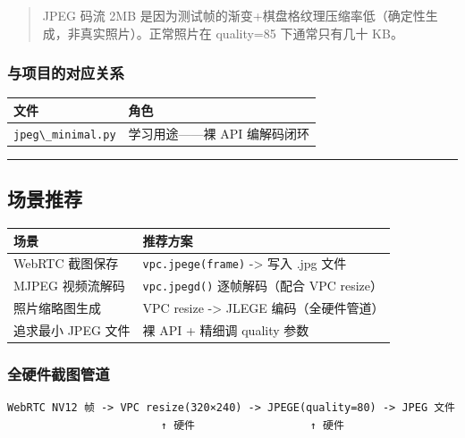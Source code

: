 \begin{quote}
JPEG 码流 2MB
是因为测试帧的渐变+棋盘格纹理压缩率低（确定性生成，非真实照片）。正常照片在
quality=85 下通常只有几十 KB。
\end{quote}

\subsubsection{与项目的对应关系}\label{src-book-chapter6-h136}

\begin{longtable}[]{@{}ll@{}}
\toprule\noalign{}
文件 & 角色 \\
\midrule\noalign{}
\endhead
\bottomrule\noalign{}
\endlastfoot
\passthrough{\lstinline!jpeg\_minimal.py!} & 学习用途------裸 API
编解码闭环 \\
\end{longtable}

\begin{center}\rule{0.5\linewidth}{0.5pt}\end{center}

\subsection{场景推荐}\label{src-book-chapter6-h137}

\begin{longtable}[]{@{}ll@{}}
\toprule\noalign{}
场景 & 推荐方案 \\
\midrule\noalign{}
\endhead
\bottomrule\noalign{}
\endlastfoot
WebRTC 截图保存 & \passthrough{\lstinline!vpc.jpege(frame)!}
-\textgreater{} 写入 .jpg 文件 \\
MJPEG 视频流解码 & \passthrough{\lstinline!vpc.jpegd()!} 逐帧解码（配合
VPC resize） \\
照片缩略图生成 & VPC resize -\textgreater{} JLEGE 编码（全硬件管道） \\
追求最小 JPEG 文件 & 裸 API + 精细调 quality 参数 \\
\end{longtable}

\subsubsection{全硬件截图管道}\label{src-book-chapter6-h138}

\begin{lstlisting}
WebRTC NV12 帧 -> VPC resize(320×240) -> JPEGE(quality=80) -> JPEG 文件
                        ↑ 硬件                  ↑ 硬件
\end{lstlisting}


